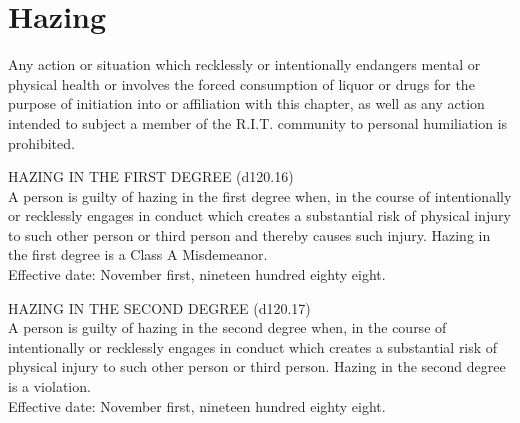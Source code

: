 \section{Hazing}
\begin{subroutines}
\item Any action or situation which recklessly or intentionally endangers mental or physical health or involves the forced consumption of liquor or drugs for the purpose of initiation into or affiliation with this chapter, as well as any action intended to  subject a member of the R.I.T.  community to personal humiliation is prohibited.
\item HAZING IN THE FIRST DEGREE (d120.16) \\
A person is guilty of hazing in the first degree when, in the course of intentionally or recklessly engages in conduct which creates a substantial risk of physical injury to such other person or third person and thereby causes such injury. Hazing in the first degree is a Class A Misdemeanor. \\
Effective date: November first, nineteen hundred eighty eight.
\item HAZING IN THE SECOND DEGREE (d120.17) \\
A person is guilty of hazing in the second degree when, in the course of intentionally or recklessly engages in conduct which creates a substantial
risk of physical injury to such other person or third person. Hazing in the second degree is a violation. \\
Effective date: November first, nineteen hundred eighty eight.
\end{subroutines}


